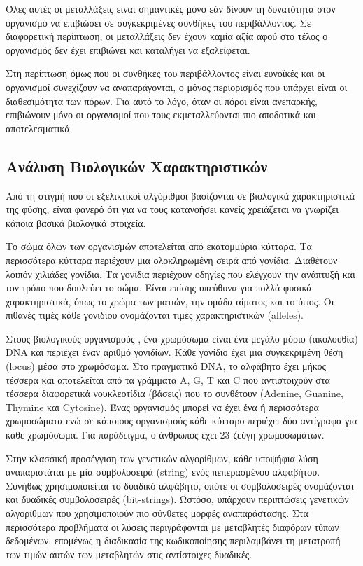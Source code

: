 Όλες αυτές οι μεταλλάξεις είναι σημαντικές μόνο εάν δίνουν τη δυνατότητα στον οργανισμό να επιβιώσει σε συγκεκριμένες συνθήκες του περιβάλλοντος. Σε διαφορετική περίπτωση, οι μεταλλάξεις δεν έχουν καμία αξία αφού στο τέλος ο οργανισμός δεν έχει επιβιώνει και καταλήγει να εξαλείφεται.

Στη περίπτωση όμως που οι συνθήκες του περιβάλλοντος είναι ευνοϊκές και οι οργανισμοί συνεχίζουν να αναπαράγονται, ο μόνος περιορισμός που υπάρχει είναι οι διαθεσιμότητα των πόρων. Για αυτό το λόγο, όταν οι πόροι είναι ανεπαρκής, επιβιώνουν μόνο οι οργανισμοί που τους εκμεταλλεύονται πιο αποδοτικά και αποτελεσματικά.

\subsection{Ανάλυση Βιολογικών Χαρακτηριστικών}
Από τη στιγμή που οι εξελικτικοί αλγόριθμοι βασίζονται σε βιολογικά χαρακτηριστικά της φύσης, είναι φανερό ότι για να τους κατανοήσει κανείς χρειάζεται να γνωρίζει κάποια βασικά βιολογικά στοιχεία.

Το σώμα όλων των οργανισμών αποτελείται από εκατομμύρια κύτταρα. Τα περισσότερα κύτταρα περιέχουν μια ολοκληρωμένη σειρά από γονίδια. Διαθέτουν λοιπόν χιλιάδες γονίδια. Τα γονίδια περιέχουν οδηγίες που ελέγχουν την ανάπτυξή και τον τρόπο που δουλεύει το σώμα. Είναι επίσης υπεύθυνα για πολλά φυσικά χαρακτηριστικά, όπως το χρώμα των ματιών, την ομάδα αίματος και το ύψος. Οι πιθανές τιμές κάθε γονιδίου ονομάζονται τιμές χαρακτηριστικών (alleles).

Στους βιολογικούς οργανισμούς \cite{Vlaxavas}, ένα χρωμόσωμα είναι ένα μεγάλο μόριο (ακολουθία) DNA και περιέχει έναν αριθμό γονιδίων. Κάθε γονίδιο έχει μια συγκεκριμένη θέση (locus) μέσα στο χρωμόσωμα. Στο πραγματικό DNA, το αλφάβητο έχει μήκος τέσσερα και αποτελείται από τα γράμματα A, G, T και C που αντιστοιχούν στα τέσσερα διαφορετικά νουκλεοτίδια (βάσεις) που το συνθέτουν (Adenine, Guanine, Thymine και Cytosine). Ένας οργανισμός μπορεί να έχει ένα ή περισσότερα χρωμοσώματα ενώ σε κάποιους οργανισμούς κάθε κύτταρο περιέχει δύο αντίγραφα για κάθε χρωμόσωμα. Για παράδειγμα, ο άνθρωπος έχει 23 ζεύγη χρωμοσωμάτων.

Στην κλασσική προσέγγιση των γενετικών αλγορίθμων, κάθε υποψήφια λύση αναπαριστάται με μία συμβολοσειρά (string) ενός πεπερασμένου αλφαβήτου. Συνήθως χρησιμοποιείται το δυαδικό αλφάβητο, οπότε οι συμβολοσειρές ονομάζονται και δυαδικές συμβολοσειρές (bit-strings). Ωστόσο, υπάρχουν περιπτώσεις γενετικών αλγορίθμων που χρησιμοποιούν πιο σύνθετες μορφές αναπαράστασης. Στα περισσότερα προβλήματα οι λύσεις περιγράφονται με μεταβλητές διαφόρων τύπων δεδομένων, επομένως η διαδικασία της κωδικοποίησης περιλαμβάνει τη μετατροπή των τιμών αυτών των μεταβλητών στις αντίστοιχες δυαδικές.

